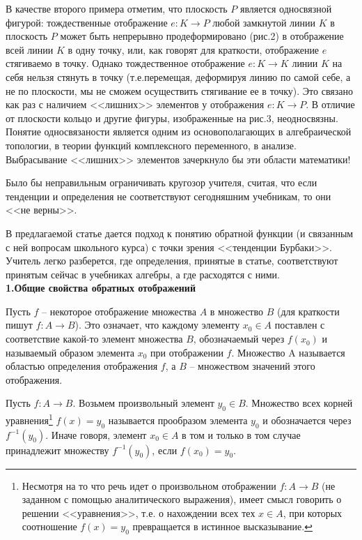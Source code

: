 \documentclass{article}
\begin{document}
\par В качестве второго примера отметим, что плоскость $P$ является односвязной фигурой: тождественные отображение $e:K\to P$ любой замкнутой линии $K$ в плоскость $P$ может быть непрерывно продеформировано (рис.2)
%
%
%
%
%
в отображение всей линии $K$ в одну точку, или, как говорят для краткости, отображение $e$ стягиваемо в точку. Однако тождественное отображение $e:K\to K$ линии $K$ на себя нельзя стянуть в точку (т.е.перемещая, деформируя линию по самой себе, а не по плоскости, мы не сможем осуществить стягивание ее в точку). Это связано как раз с наличием <<лишних>> элементов у отображения $e:K\to P$. В отличие от плоскости кольцо и другие фигуры, изображенные на рис.3, неодносвязны. Понятие односвязаности является одним из основополагающих в алгебраической топологии, в теории функций комплексного переменного, в анализе. Выбрасывание <<лишних>> элементов зачеркнуло бы эти области математики!
\par Было бы неправильным ограничивать кругозор учителя, считая, что если тенденции и определения не соответствуют сегодняшним учебникам, то они <<не верны>>.
\par В предлагаемой статье дается подход к понятию обратной функции (и связанным с ней вопросам школьного курса) с точки зрения <<тенденции Бурбаки>>. Учитель легко разберется, где определения, принятые в статье, соответствуют принятым сейчас в учебниках алгебры, а где расходятся с ними.
\\\textbf{1.Общие свойства обратных отображений}
\par Пусть $f$ -- некоторое отображение множества $A$ в множество $B$ (для краткости пишут $f\colon A\to B$). Это означает, что каждому элементу $x_0\in A$ поставлен с соответствие какой-то элемент множества $B$, обозначаемый через $f(x_0)$ и называемый образом элемента $x_0$ при отображении $f$. Множество A называется областью определения отображения $f$, а $B$ -- множеством значений этого отображения.
\par Пусть $f\colon A\to B$. Возьмем произвольный элемент $y_0\in B$. Множество всех корней уравнения\footnote[1]{Несмотря на то что речь идет о произвольном отображении $f\colon A\to B$ (не заданном с помощью аналитического выражения), имеет смысл говорить о решении <<уравнения>>, т.е. о нахождении всех тех $x\in A$, при которых соотношение $f(x)=y_0$ превращается в истинное высказывание.} $f(x)=y_0$ называется прообразом элемента $y_0$ и обозначается через $f^{-1}(y_0)$. Иначе говоря, элемент $x_0\in A$ в том и только в том случае принадлежит множеству $f^{-1}(y_0)$, если $f(x_0)=y_0$.
\end{document}
